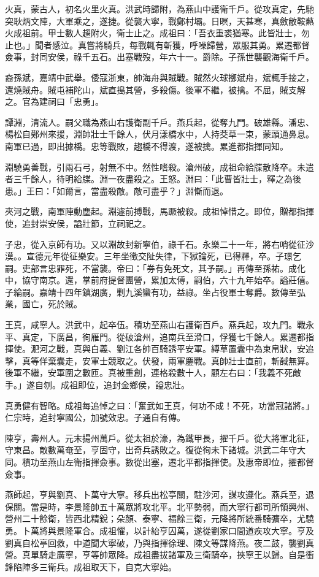\begin{pinyinscope}
火真，蒙古人，初名火里火真。洪武時歸附，為燕山中護衛千戶。從攻真定，先馳突耿炳文陣，大軍乘之，遂捷。從襲大寧，戰鄭村壩。日暝，天甚寒，真斂敝鞍爇火成祖前。甲士數人趨附火，衛士止之。成祖曰：「吾衣重裘猶寒。此皆壯士，勿止也。」聞者感泣。真嘗將騎兵，每戰輒有斬獲，呼噪歸營，眾服其勇。累遷都督僉事，封同安侯，祿千五石。出塞戰歿，年六十一。爵除。子孫世襲觀海衛千戶。

裔孫斌，嘉靖中武舉。倭寇浙東，帥海舟與賊戰。賊然火球擲斌舟，斌輒手接之，還燒賊舟。賊屯補陀山，斌直搗其營，多殺傷。後軍不繼，被擒。不屈，賊支解之。官為建祠曰「忠勇」。

譚淵，清流人。嗣父職為燕山右護衛副千戶。燕兵起，從奪九門。破雄縣。潘忠、楊松自鄚州來援，淵帥壯士千餘人，伏月漾橋水中，人持茭草一束，蒙頭通鼻息。南軍已過，即出據橋。忠等戰敗，趨橋不得渡，遂被擒。累進都指揮同知。

淵驍勇善戰，引兩石弓，射無不中。然性嗜殺。滄州破，成祖命給牒散降卒。未遣者三千餘人，待明給牒。淵一夜盡殺之。王怒。淵曰：「此曹皆壯士，釋之為後患。」王曰：「如爾言，當盡殺敵。敵可盡乎？」淵慚而退。

夾河之戰，南軍陣動塵起。淵遽前搏戰，馬蹶被殺。成祖悼惜之。即位，贈都指揮使，追封崇安侯，謚壯節，立祠祀之。

子忠，從入京師有功。又以淵故封新寧伯，祿千石。永樂二十一年，將右哨從征沙漠。。宣德元年從征樂安。三年坐徵交阯失律，下獄論死，已得釋，卒。子璟乞嗣。吏部言忠罪死，不當襲。帝曰：「券有免死文，其予嗣。」再傳至孫祐。成化中，協守南京。還，掌前府提督團營，累加太傅，嗣伯，六十九年始卒。謚莊僖。子綸嗣。嘉靖十四年鎮湖廣，剿九溪蠻有功，益祿。坐占役軍士奪爵。數傳至弘業，國亡，死於賊。

王真，咸寧人。洪武中，起卒伍。積功至燕山右護衛百戶。燕兵起，攻九門。戰永平、真定，下廣昌，徇雁門。從破滄州，追南兵至滑口，俘獲七千餘人。累遷都指揮使。淝河之戰，真與白義、劉江各帥百騎誘平安軍。縛草置囊中為束帛狀，安追擊，真等佯棄囊走，安軍士競取之。伏發，兩軍鏖戰。真帥壯士直前，斬馘無算。後軍不繼，安軍圍之數匝。真被重創，連格殺數十人，顧左右曰：「我義不死敵手。」遂自刎。成祖即位，追封金鄉侯，謚忠壯。

真勇健有智略。成祖每追悼之曰：「奮武如王真，何功不成！不死，功當冠諸將。」仁宗時，追封寧國公，加號效忠。子通自有傳。

陳亨，壽州人。元末揚州萬戶。從太祖於濠，為鐵甲長，擢千戶。從大將軍北征，守東昌。敵數萬奄至，亨固守，出奇兵誘敗之。復從徇未下諸城。洪武二年守大同。積功至燕山左衛指揮僉事。數從出塞，遷北平都指揮使。及惠帝即位，擢都督僉事。

燕師起，亨與劉真、卜萬守大寧。移兵出松亭關，駐沙河，謀攻遵化。燕兵至，退保關。當是時，李景隆帥五十萬眾將攻北平。北平勢弱，而大寧行都司所領興州、營州二十餘衛，皆西北精銳；朵顏、泰寧、福餘三衛，元降將所統番騎彍卒，尤驍勇。卜萬將與景隆軍合。成祖懼，以計紿亨囚萬，遂從劉家口間道疾攻大寧。亨及劉真自松亭回救，中道聞大寧破，乃與指揮徐理、陳文等謀降燕。夜二鼓，襲劉真營。真單騎走廣寧，亨等帥眾降。成祖盡拔諸軍及三衛騎卒，挾寧王以歸。自是衝鋒陷陣多三衛兵。成祖取天下，自克大寧始。


\end{pinyinscope}
